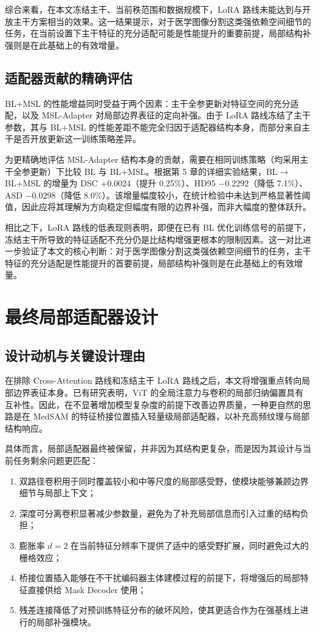 综合来看，在本文冻结主干、当前秩范围和数据规模下，LoRA 路线未能达到与开放主干方案相当的效果。这一结果提示，对于医学图像分割这类强依赖空间细节的任务，在当前设置下主干特征的充分适配可能是性能提升的重要前提，局部结构补强则是在此基础上的有效增量。

\subsection{适配器贡献的精确评估}

BL+MSL 的性能增益同时受益于两个因素：主干全参更新对特征空间的充分适配，以及 MSL-Adapter 对局部边界表征的定向补强。由于 LoRA 路线冻结了主干参数，其与 BL+MSL 的性能差距不能完全归因于适配器结构本身，而部分来自主干是否开放更新这一训练策略差异。

为更精确地评估 MSL-Adapter 结构本身的贡献，需要在相同训练策略（均采用主干全参更新）下比较 BL 与 BL+MSL。根据第 5 章的详细实验结果，BL$\to$BL+MSL 的增量为 DSC +0.0024（提升 0.25\%）、HD95 $-$0.2292（降低 7.1\%）、ASD $-$0.0298（降低 8.0\%）。该增量幅度较小，在统计检验中未达到严格显著性阈值，因此应将其理解为方向稳定但幅度有限的边界补强，而非大幅度的整体跃升。

相比之下，LoRA 路线的低表现则表明，即便在已有 BL 优化训练信号的前提下，冻结主干所导致的特征适配不充分仍是比结构增强更根本的限制因素。这一对比进一步验证了本文的核心判断：对于医学图像分割这类强依赖空间细节的任务，主干特征的充分适配是性能提升的首要前提，局部结构补强则是在此基础上的有效增量。

\section{最终局部适配器设计}

\subsection{设计动机与关键设计理由}

在排除 Cross-Attention 路线和冻结主干 LoRA 路线之后，本文将增强重点转向局部边界表征本身。已有研究表明，ViT 的全局注意力与卷积的局部归纳偏置具有互补性\cite{dai2021coatnet}。因此，在不显著增加模型复杂度的前提下改善边界质量，一种更自然的思路是在 MedSAM 的特征桥接位置插入轻量级局部适配器，以补充高频纹理与局部结构响应。

具体而言，局部适配器最终被保留，并非因为其结构更复杂，而是因为其设计与当前任务剩余问题更匹配：
\begin{enumerate}
  \item 双路径卷积用于同时覆盖较小和中等尺度的局部感受野，使模块能够兼顾边界细节与局部上下文；
  \item 深度可分离卷积显著减少参数量，避免为了补充局部信息而引入过重的结构负担；
  \item 膨胀率 $d=2$ 在当前特征分辨率下提供了适中的感受野扩展，同时避免过大的栅格效应；
  \item 桥接位置插入能够在不干扰编码器主体建模过程的前提下，将增强后的局部特征直接供给 Mask Decoder 使用；
  \item 残差连接降低了对预训练特征分布的破坏风险，使其更适合作为在强基线上进行的局部补强模块。
\end{enumerate}

